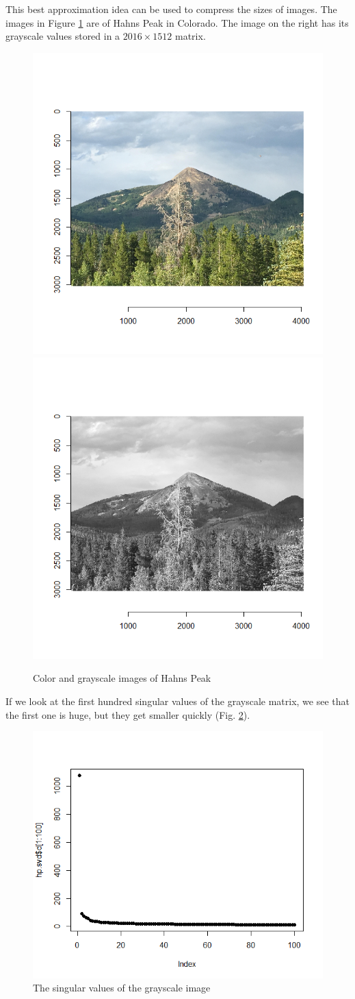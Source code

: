 \documentclass[
]{book}
\theoremstyle{definition}
\theoremstyle{definition}
\theoremstyle{definition}
\theoremstyle{definition}
\theoremstyle{remark}
\begin{document}
This best approximation idea can be used to compress the sizes of images. The images in Figure \ref{fig:hp12} are of Hahns Peak in Colorado. The image on the right has its grayscale values stored in a \(2016\times 1512\) matrix.

\begin{figure}

{\centering \includegraphics[width=0.4\linewidth]{images/hpc} \includegraphics[width=0.4\linewidth]{images/hpbw} 

}

\caption{Color and grayscale images of Hahns Peak}\label{fig:hp12}
\end{figure}

If we look at the first hundred singular values of the grayscale matrix, we see that the first one is huge, but they get smaller quickly (Fig. \ref{fig:hpsvd}).

\begin{figure}

{\centering \includegraphics[width=0.5\linewidth]{images/svdp1} 

}

\caption{The singular values of the grayscale image}\label{fig:hpsvd}
\end{figure}
\end{document}
